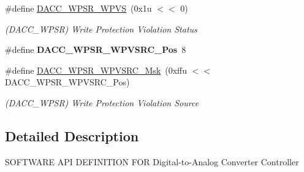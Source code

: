 \begin{DoxyCompactItemize}
\mbox{\label{group__SAME70__DACC_ga5ae2d17379a2528900c8084440ee66a3}} 
\#define \mbox{\hyperlink{group__SAME70__DACC_ga5ae2d17379a2528900c8084440ee66a3}{D\+A\+C\+C\+\_\+\+W\+P\+S\+R\+\_\+\+W\+P\+VS}}~(0x1u $<$$<$ 0)
\begin{DoxyCompactList}\small\item\em (D\+A\+C\+C\+\_\+\+W\+P\+SR) Write Protection Violation Status \end{DoxyCompactList}\item 
\mbox{\label{group__SAME70__DACC_ga4ef4dcc3bf2e023b9638d70b2c13e727}} 
\#define {\bfseries D\+A\+C\+C\+\_\+\+W\+P\+S\+R\+\_\+\+W\+P\+V\+S\+R\+C\+\_\+\+Pos}~8
\item 
\mbox{\label{group__SAME70__DACC_gaec9589b916ff63d79b578e7b3d8f2af9}} 
\#define \mbox{\hyperlink{group__SAME70__DACC_gaec9589b916ff63d79b578e7b3d8f2af9}{D\+A\+C\+C\+\_\+\+W\+P\+S\+R\+\_\+\+W\+P\+V\+S\+R\+C\+\_\+\+Msk}}~(0xffu $<$$<$ D\+A\+C\+C\+\_\+\+W\+P\+S\+R\+\_\+\+W\+P\+V\+S\+R\+C\+\_\+\+Pos)
\begin{DoxyCompactList}\small\item\em (D\+A\+C\+C\+\_\+\+W\+P\+SR) Write Protection Violation Source \end{DoxyCompactList}\end{DoxyCompactItemize}


\subsection{Detailed Description}
S\+O\+F\+T\+W\+A\+RE A\+PI D\+E\+F\+I\+N\+I\+T\+I\+ON F\+OR Digital-\/to-\/\+Analog Converter Controller 